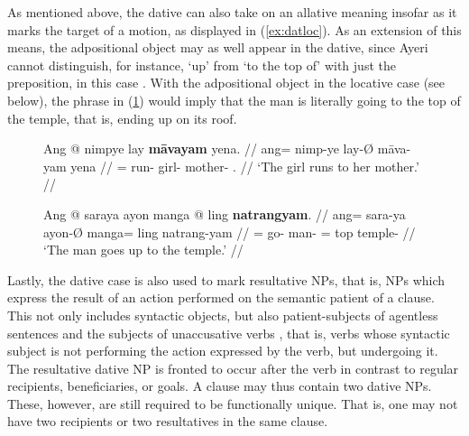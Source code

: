 As mentioned above, the dative can also take on an allative meaning insofar as
it marks the target of a motion, as displayed in (\ref{ex:datloc}). As an
extension of this means, the adpositional object may as well appear in the
dative, since Ayeri cannot distinguish, for instance, `up' from `to the top of'
with just the preposition, in this case . With the
adpositional object in the locative case (see below), the phrase in
(\ref{ex:datlocprep}) would imply that the man is literally going to the top
of the temple, that is, ending up on its roof.

\begin{figure}[h]
\pex
\a\label{ex:datloc}\begingl
	\gla Ang @ nimpye lay \textbf{māvayam} yena. //
	\glb ang= nimp-ye lay-Ø māva-yam yena //
	\glc \AgtT{}= run-\TsgF{} girl-\Top{} mother-\Dat{} \TsgF{}.\Gen{} //
	\glft `The girl runs to her mother.' //
\endgl

\a\label{ex:datlocprep}\begingl
	\gla Ang @ saraya ayon manga @ ling \textbf{natrangyam}. //
	\glb ang= sara-ya ayon-Ø manga= ling natrang-yam //
	\glc \AgtT{}= go-\TsgM{} man-\Top{} \Dir{}= top temple-\Dat{} //
	\glft `The man goes up to the temple.' //
\endgl
\xe
\end{figure}

Lastly, the dative case is also used to mark resultative NPs, that is, NPs
which express the result of an action performed on the semantic patient of a
clause. This not only includes syntactic objects, but also patient-subjects of
agentless sentences and the subjects of unaccusative verbs
\citep{perlmutter1978}, that is, verbs whose syntactic subject is not
performing the action expressed by the verb, but undergoing it. The resultative
dative NP is fronted to occur after the verb in contrast to regular recipients,
beneficiaries, or goals. A clause may thus contain two dative NPs. These,
however, are still required to be functionally unique. That is, one may not
have two recipients or two resultatives in the same clause.

